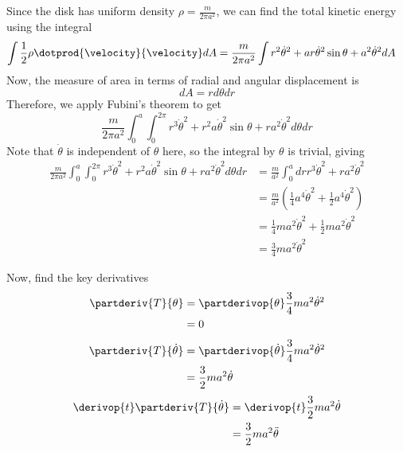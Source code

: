 \begin{itemize}
  Since the disk has uniform density $\rho = \frac{m}{2\pi a^2}$, we can
  find the total kinetic energy using the integral
  \begin{align*}
    \int \frac{1}{2}\rho \dotprod{\velocity}{\velocity} dA
    &=
    \frac{m}{2\pi a^2}
    \int
    r^2\dot{\theta}^2 +
    ar\dot{\theta}^2\sin{\theta} +
    a^2\dot{\theta}^2
    dA
    \end{align*}
  Now, the measure of area in terms of radial and angular displacement
  is
  \[ dA = rd\theta dr \]
  Therefore, we apply Fubini's theorem to get
  \[
  \frac{m}{2\pi a^2} \int_0^a \int_0^{2\pi}
  r^3\dot{\theta}^2 +
  r^2a\dot{\theta}^2\sin{\theta} +
  ra^2\dot{\theta}^2
  d\theta dr
  \]
  Note that $\dot{\theta}$ is independent of $\theta$ here, so the
  integral by $\theta$ is trivial, giving
  \begin{align*}
    \frac{m}{2\pi a^2} \int_0^a \int_0^{2\pi}
    r^3\dot{\theta}^2 +
    r^2a\dot{\theta}^2\sin{\theta} +
    ra^2\dot{\theta}^2
    d\theta dr
    &=
    \frac{m}{a^2} \int_0^a dr
    r^3\dot{\theta}^2 +
    ra^2\dot{\theta}^2 \\
    &=
    \frac{m}{a^2}
    \left(\frac{1}{4} a^4\dot{\theta}^2 +
    \frac{1}{2} a^4\dot{\theta}^2\right) \\
    &=
    \frac{1}{4}ma^2\dot{\theta}^2 + \frac{1}{2} ma^2\dot{\theta}^2 \\
    &=
    \frac{3}{4}ma^2\dot{\theta}^2
  \end{align*}

  Now, find the key derivatives
  \begin{align*}
    \partderiv{T}{\theta}
    &=
    \partderivop{\theta}\frac{3}{4}ma^2\dot{\theta}^2 \\
    &=
    0
  \end{align*}
  \begin{align*}
    \partderiv{T}{\dot{\theta}}
    &=
    \partderivop{\dot{\theta}}\frac{3}{4}ma^2\dot{\theta}^2 \\
    &=
    \frac{3}{2}ma^2\dot{\theta}
  \end{align*}
  \begin{align*}
    \derivop{t}\partderiv{T}{\dot{\theta}}
    &=
    \derivop{t}\frac{3}{2}ma^2\dot{\theta} \\
    &=
    \frac{3}{2}ma^2\ddot{\theta}
  \end{align*}


\end{itemize}
